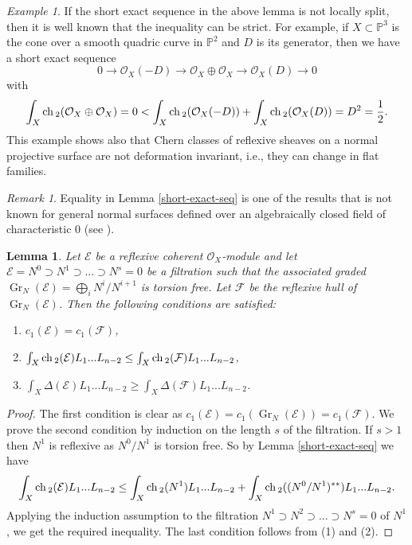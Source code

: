 \documentclass[12pt]{article}
\theoremstyle{plain}
\newtheorem{Lemma}[Thm]{\sc Lemma}
\theoremstyle{definition}
\theoremstyle{remark}
\newtheorem{Remark}[Thm]{Remark}
\newtheorem{Example}[Thm]{Example}
\newcommand{\PP}{{\mathbb P}}
\newcommand{\cE}{{\mathcal E}}
\newcommand{\cF}{{\mathcal F}}
\newcommand{\cO}{{\mathcal O}}
\newcommand{\ch}{{\mathop{\rm ch \, }}}
\newcommand{\Gr}{{\mathop{Gr}}}
\begin{document}
\medskip

\begin{Example}\label{singular-quadric}
If the short exact sequence in the above lemma is not locally split, then it is well known that the  inequality can be strict. For example, if $X\subset \PP ^3$ is the cone over a smooth quadric curve in $\PP ^2$ and $D$ is its generator, then we have a short exact sequence
$$0\to \cO_X (-D)\to  \cO_X\oplus \cO_X \to \cO_X (D)\to 0$$
with
$$\int _X \ch _2 ( \cO_X\oplus \cO_X)=0<\int _X \ch _2 ( \cO_X (-D))+\int _X \ch _2 ( \cO_X (D))= D^2=\frac{1}{2}.$$
This example shows also that Chern classes of reflexive sheaves on a normal projective surface
are not deformation invariant, i.e., they can change in flat families.
\end{Example}

\medskip

\begin{Remark}
Equality in Lemma \ref{short-exact-seq} is one of the results that is  not known for general normal surfaces defined over an algebraically closed field of characteristic $0$ (see \cite{La-Chern}). 
\end{Remark}


\medskip

\begin{Lemma}\label{Chern-classes-filtrations}
Let $\cE$ be a reflexive coherent $\cO_X$-module and let $\cE=N^0\supset
N^1\supset ...\supset N^s=0$ be a filtration such that the associated graded $\Gr
_N(\cE)=\bigoplus _i N^i/N^{i+1}$ is torsion free. Let $\cF$ be the reflexive hull of  $\Gr
_N(\cE)$. Then the following conditions are satisfied:
\begin{enumerate}
\item $c _1 (\cE )=c_1 (\cF)$,
\item $\int _X \ch _2 (\cE)L_1...L_{n-2} \le \int _X \ch _2 (\cF)L_1...L_{n-2} $,
\item $\int _X \Delta  (\cE)L_1...L_{n-2}\ge \int _X \Delta  (\cF)L_1...L_{n-2} $.
\end{enumerate}
\end{Lemma}

\begin{proof}
The first condition is clear as  $c _1 (\cE )=c_1(\Gr_N(\cE))=c_1 (\cF)$.
We prove the second condition by induction on the length $s$ of the filtration.
If $s>1$ then $N^1$ is reflexive as $N^0/N^1$ is torsion free. So by Lemma \ref{short-exact-seq}
we have
$$\int _X \ch _2 (\cE)L_1...L_{n-2} \le \int _X \ch _2 (N^1)L_1...L_{n-2}+  \int _X \ch _2 ((N^0/N^1)^{**})L_1...L_{n-2}.$$
Applying the induction assumption to the filtration $N^1\supset N^2\supset ...\supset N^s=0$ of $N^1$,
we get the required inequality. The last condition follows from (1) and (2).
\end{proof}
\end{document}
